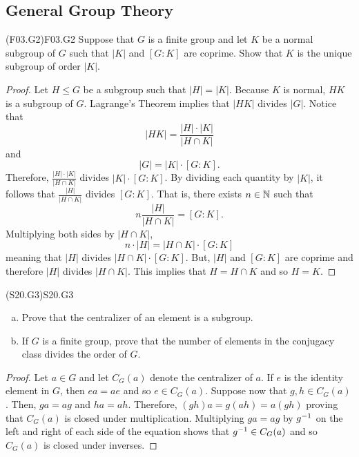 \documentclass[../../AlgebraQualSolutions.tex]{subfiles}
\begin{document}
\subsection{General Group Theory}

\begin{prob}{(F03.G2)}{F03.G2}
	Suppose that $G$ is a finite group and let $K$ be a normal subgroup of $G$ such that $|K|$ and $[G:K]$ are coprime. Show that $K$ is the unique subgroup of order $|K|$.
\end{prob}

\begin{proof}
	Let $H \leq G$ be a subgroup such that $|H| = |K|$. Because $K$ is normal,  $HK$ is a subgroup of $G$. Lagrange's Theorem implies that $|HK|$ divides $|G|$. Notice that
		\[|HK| = \frac{|H| \cdot |K|}{|H \cap K|}\]
	and
		\[|G| = |K| \cdot [G:K].\]
	Therefore, $\frac{|H| \cdot |K|}{|H \cap K|}$ divides $|K| \cdot [G:K]$. By dividing each quantity by $|K|$, it follows that $\frac{|H|}{|H\cap K|}$ divides $[G:K]$. That is, there exists $n \in \mathbb{N}$ such that
		\[n \frac{|H|}{|H \cap K|} = [G:K].\]
	Multiplying both sides by $|H \cap K|$,
		\[n \cdot |H| = |H\cap K| \cdot [G:K]\]
	meaning that $|H|$ divides $|H\cap K| \cdot [G:K]$. But, $|H|$ and $[G:K]$ are coprime and therefore $|H|$ divides $|H \cap K|$. This implies that $H = H \cap K$ and so $H = K$.
\end{proof}

\begin{prob}{(S20.G3)}{S20.G3}
	\begin{enumerate}[(a)]
	\item Prove that the centralizer of an element is a subgroup.
	\item If $G$ is a finite group, prove that the number of elements in the conjugacy class divides the order of $G$.
	\end{enumerate}
	\end{prob}
	
	\begin{proof}
		Let $a \in G$ and let $C_G(a)$ denote the centralizer of $a$. If $e$ is the identity element in $G$, then $ea = ae$ and so $e \in C_G(a)$. Suppose now that $g,h \in C_G(a)$. Then, $ga = ag$ and $ha = ah$. Therefore, $(gh)a = g(ah) = a(gh)$ proving that $C_G(a)$ is closed under multiplication. Multiplying $ga = ag$ by $g^{-1}$ on the left and right of each side of the equation shows that $g^{-1} \in C_G(a)$ and so $C_G(a)$ is closed under inverses.
	\end{proof}
	
\end{document}
